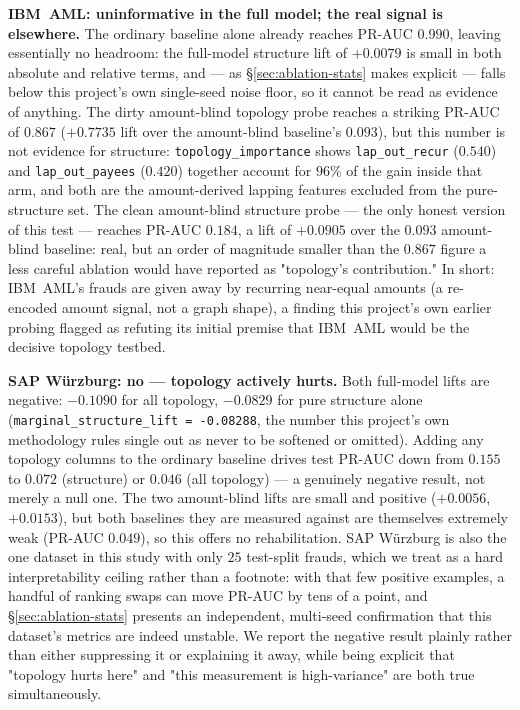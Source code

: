 \textbf{IBM~AML: uninformative in the full model; the real signal is elsewhere.} The ordinary baseline alone already reaches PR-AUC $0.990$, leaving essentially no headroom: the full-model structure lift of $+0.0079$ is small in both absolute and relative terms, and — as \S\ref{sec:ablation-stats} makes explicit — falls below this project's own single-seed noise floor, so it cannot be read as evidence of anything. The dirty amount-blind topology probe reaches a striking PR-AUC of $0.867$ ($+0.7735$ lift over the amount-blind baseline's $0.093$), but this number is not evidence for structure: \texttt{topology\_importance} shows \texttt{lap\_out\_recur} ($0.540$) and \texttt{lap\_out\_payees} ($0.420$) together account for $96\%$ of the gain inside that arm, and both are the amount-derived lapping features excluded from the pure-structure set. The clean amount-blind structure probe — the only honest version of this test — reaches PR-AUC $0.184$, a lift of $+0.0905$ over the $0.093$ amount-blind baseline: real, but an order of magnitude smaller than the $0.867$ figure a less careful ablation would have reported as "topology's contribution." In short: IBM~AML's frauds are given away by recurring near-equal amounts (a re-encoded amount signal, not a graph shape), a finding this project's own earlier probing flagged as refuting its initial premise that IBM~AML would be the decisive topology testbed.

\textbf{SAP W\"urzburg: no — topology actively hurts.} Both full-model lifts are negative: $-0.1090$ for all topology, $-0.0829$ for pure structure alone (\texttt{marginal\_structure\_lift = -0.08288}, the number this project's own methodology rules single out as never to be softened or omitted). Adding any topology columns to the ordinary baseline drives test PR-AUC down from $0.155$ to $0.072$ (structure) or $0.046$ (all topology) — a genuinely negative result, not merely a null one. The two amount-blind lifts are small and positive ($+0.0056$, $+0.0153$), but both baselines they are measured against are themselves extremely weak (PR-AUC $0.049$), so this offers no rehabilitation. SAP W\"urzburg is also the one dataset in this study with only $25$ test-split frauds, which we treat as a hard interpretability ceiling rather than a footnote: with that few positive examples, a handful of ranking swaps can move PR-AUC by tens of a point, and \S\ref{sec:ablation-stats} presents an independent, multi-seed confirmation that this dataset's metrics are indeed unstable. We report the negative result plainly rather than either suppressing it or explaining it away, while being explicit that "topology hurts here" and "this measurement is high-variance" are both true simultaneously.

